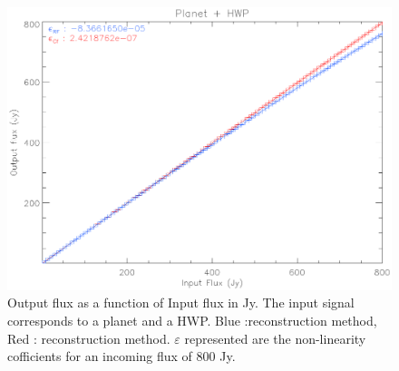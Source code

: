 \begin{figure}[h]
\center
	\includegraphics[scale=0.5]{Figures/nl-planet-hwp.eps}
	\caption{Output flux as a function of Input flux in Jy. The input signal corresponds to a planet and a HWP. Blue :\rf reconstruction method, Red : \cf reconstruction method. $\varepsilon$  represented are the non-linearity cofficients for an incoming flux of 800 Jy.}
	\label{fig:nl-planet-hwp}
\end{figure}

